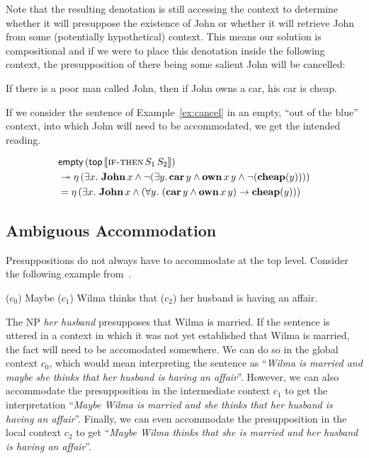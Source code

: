 Note that the resulting denotation is still accessing the context to
determine whether it will presuppose the existence of John or whether it
will retrieve John from some (potentially hypothetical) context. This means
our solution is compositional and if we were to place this denotation
inside the following context, the presupposition of there being some
salient John will be cancelled:

\begin{exe}
  \ex If there is a poor man called John, then if John owns a car, his car
  is cheap.
\end{exe}

If we consider the sentence of Example~\ref{ex:cancel} in an empty, ``out
of the blue'' context, into which John will need to be accommodated, we get
the intended reading.

\begin{align*}
  &\ap{\EMPTY}{(\ap{\TOP}{\sem{\app{\abs{if-then}}{S_1}{S_2}}})} \\
  &\tto \etaE{(\exists x.\ \ap{\obj{John}}{x} \land \lnot (\exists y.\, \ap{\obj{car}}{y} \land \app{\obj{own}}{x}{y} \land \lnot (\obj{cheap}(y))))} \\
  &= \etaE{(\exists x.\ \ap{\obj{John}}{x} \land (\forall y.\ (\ap{\obj{car}}{y} \land \app{\obj{own}}{x}{y}) \to \obj{cheap}(y)))}
\end{align*}


\subsection{Ambiguous Accommodation}
\label{ssec:ambiguous-accommodation}

Presuppositions do not always have to accommodate at the top
level. Consider the following example from~\cite{sep-presupposition}.

\begin{exe}
  \ex \label{ex:wilma} ($c_0$) Maybe ($c_1$) Wilma thinks that ($c_2$) her husband is having an affair.
\end{exe}

The NP \emph{her husband} presupposes that Wilma is married. If the
sentence is uttered in a context in which it was not yet established that
Wilma is married, the fact will need to be accomodated somewhere. We can do
so in the global context $c_0$, which would mean interpreting the sentence
as ``\emph{Wilma is married and maybe she thinks that her husband is having
  an affair}''. However, we can also accommodate the presupposition in the
intermediate context $c_1$ to get the interpretation ``\emph{Maybe Wilma is
  married and she thinks that her husband is having an affair}''. Finally,
we can even accommodate the presupposition in the local context $c_2$ to
get ``\emph{Maybe Wilma thinks that she is married and her husband is
  having an affair}''.

